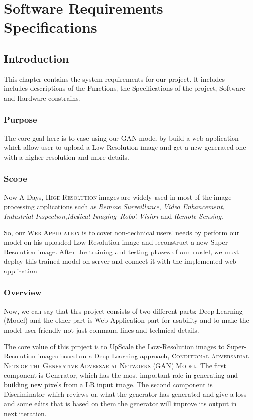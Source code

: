\documentclass[12pt]{article}
\begin{document}
	\clearpage
	\section{Software Requirements Specifications}
		\subsection{Introduction}
			This chapter contains the system requirements for our project. It includes includes descriptions of the Functions, the Specifications of the project, Software and Hardware constrains.
			\subsubsection{Purpose}
				The core goal here is to ease using our GAN model by build a web application which allow user to upload a Low-Resolution image and get a new generated one with a higher resolution and more details.
			\subsubsection{Scope}
				Now-A-Days, \textsc{High Resolution} images are widely used in most of the image processing applications such as \textit{Remote Surveillance}, \textit{Video Enhancement}, \textit{Industrial Inspection},\textit{Medical Imaging}, \textit{Robot Vision} and \textit{Remote Sensing}.
				
				So, our \textsc{Web Application} is to cover non-technical users' needs by perform our model on his uploaded Low-Resolution image and reconstruct a new Super-Resolution image. After the training and testing phases of our model, we must deploy this trained model on server and connect it with the implemented web application.
			\subsubsection{Overview}
				Now, we can say that this project consists of two different parts: Deep Learning (Model) and the other part is Web Application part for usability and to make the model user friendly not just command lines and technical details.
				
				The core value of this project is to UpScale the Low-Resolution images to Super-Resolution images based on a Deep Learning approach, \textsc{Conditional Adversarial Nets of the Generative Adversarial Networks (GAN) Model}. The first component is Generator, which has the most important role in generating and building new pixels from a LR input image. The second component is Discriminator which reviews on what the generator has generated and give a loss and some edits that is based on them the generator will improve its output in next iteration.
				
\end{document}
